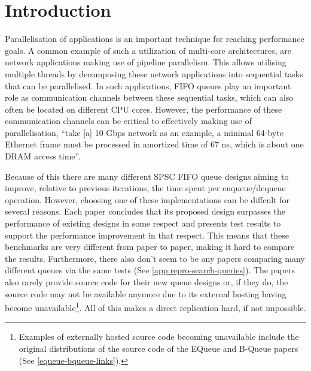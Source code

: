 \section{Introduction}
\label{sec:introduction}
Parallelisation of applications is an important technique for reaching performance goals.
A common example of such a utilization of multi-core architectures, are network applications making use
of pipeline parallelism\cite{Upadhyaya2007,WangCheng2009}.
This allows utilising multiple threads by decomposing these network applications into sequential tasks that can be
parallelised\cite{WangCheng2009}.
In such applications, FIFO queues play an important role as communication channels between these sequential
tasks, which can also often be located on different CPU cores.
However, the performance of these communication channels can be critical to effectively making use of
parallelisation, ``take [a] 10 Gbps network as an example, a minimal 64-byte Ethernet frame must be processed
in amortized time of 67 ns, which is about one DRAM access time''\cite{B-Queue}.

Because of this there are many different SPSC FIFO queue designs aiming to improve, relative to previous
iterations, the time spent per enqueue/dequeue operation\cite{B-Queue,EQueue,FastForward,FastFlowGithub,MCRingBuffer}.
However, choosing one of these implementations can be diffcult for several reasons.
Each paper concludes that its proposed design surpasses the performance of existing designs in some
respect and presents test results to support the performance improvement in that respect.
This means that these benchmarks are very different from paper to paper, making it hard to compare the results.
Furthermore, there also don't seem to be any papers comparing many different queues via the same tests (See
\autoref{app:repro-search-queries}).
The papers also rarely provide source code for their new queue designs or, if they do, the source code may
not be available anymore due to its external hosting having become unavailable\footnote{Examples of externally
    hosted source code becoming unavailable include the original distributions of the source code of the EQueue
and B-Queue papers (See \autoref{equeue-bqueue-links}).}.
All of this makes a direct replication hard, if not impossible\cite{sep-scientific-reproducibility}.

